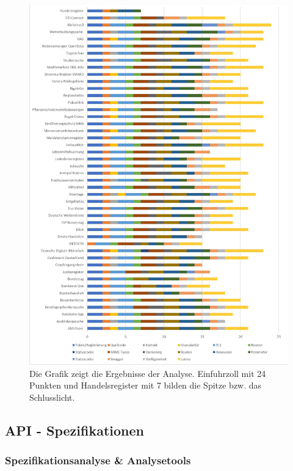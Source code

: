 \documentclass[notitlepage, hidelinks]{article}
\begin{document}
\begin{figure}[H]
\centering
  \includegraphics[width=\textwidth]{images/chart.jpg}
  \caption{Die Grafik zeigt die Ergebnisse der Analyse. Einfuhrzoll mit 24 Punkten und Handelsregister mit 7 bilden die Spitze bzw. das Schlusslicht.}
  \label{chart}
\end{figure}


\subsection{API - Spezifikationen}
\subsubsection{Spezifikationsanalyse \& Analysetools}
\end{document}
